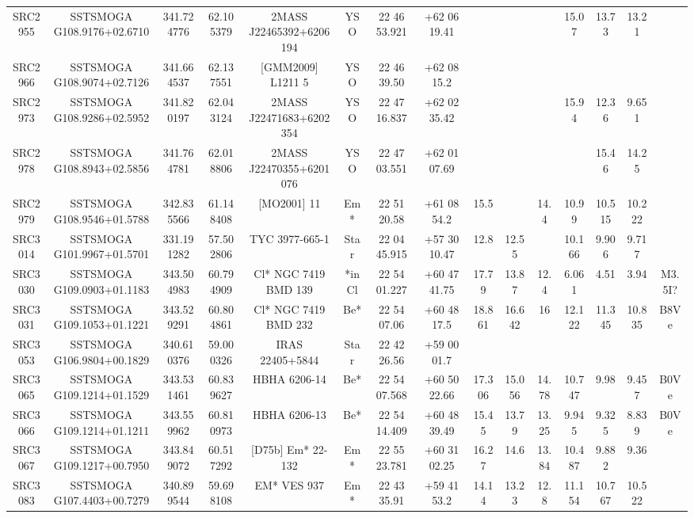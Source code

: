 \begin{table}
\begin{tabular}{ccccccccccccccc}
SRC2955 & SSTSMOGA G108.9176+02.6710 & 341.724776 & 62.105379 & 2MASS J22465392+6206194 & YSO & 22 46 53.921 & +62 06 19.41 &  &  &  & 15.07 & 13.73 & 13.21 &  \\
SRC2966 & SSTSMOGA G108.9074+02.7126 & 341.664537 & 62.137551 & [GMM2009] L1211  5 & YSO & 22 46 39.50 & +62 08 15.2 &  &  &  &  &  &  &  \\
SRC2973 & SSTSMOGA G108.9286+02.5952 & 341.820197 & 62.043124 & 2MASS J22471683+6202354 & YSO & 22 47 16.837 & +62 02 35.42 &  &  &  & 15.94 & 12.36 & 9.651 &  \\
SRC2978 & SSTSMOGA G108.8943+02.5856 & 341.764781 & 62.018806 & 2MASS J22470355+6201076 & YSO & 22 47 03.551 & +62 01 07.69 &  &  &  &  & 15.46 & 14.25 &  \\
SRC2979 & SSTSMOGA G108.9546+01.5788 & 342.835566 & 61.148408 & [MO2001]  11 & Em* & 22 51 20.58 & +61 08 54.2 & 15.5 &  & 14.4 & 10.99 & 10.515 & 10.222 &  \\
SRC3014 & SSTSMOGA G101.9967+01.5701 & 331.191282 & 57.502806 & TYC 3977-665-1 & Star & 22 04 45.915 & +57 30 10.47 & 12.8 & 12.55 &  & 10.166 & 9.906 & 9.717 &  \\
SRC3030 & SSTSMOGA G109.0903+01.1183 & 343.504983 & 60.794909 & Cl* NGC 7419    BMD     139 & *inCl & 22 54 01.227 & +60 47 41.75 & 17.79 & 13.87 & 12.4 & 6.061 & 4.51 & 3.94 & M3.5I? \\
SRC3031 & SSTSMOGA G109.1053+01.1221 & 343.529291 & 60.804861 & Cl* NGC 7419    BMD     232 & Be* & 22 54 07.06 & +60 48 17.5 & 18.861 & 16.642 & 16 & 12.122 & 11.345 & 10.835 & B8Ve \\
SRC3053 & SSTSMOGA G106.9804+00.1829 & 340.610376 & 59.000326 & IRAS 22405+5844 & Star & 22 42 26.56 & +59 00 01.7 &  &  &  &  &  &  &  \\
SRC3065 & SSTSMOGA G109.1214+01.1529 & 343.531461 & 60.839627 & HBHA 6206-14 & Be* & 22 54 07.568 & +60 50 22.66 & 17.306 & 15.056 & 14.78 & 10.747 & 9.98 & 9.457 & B0Ve \\
SRC3066 & SSTSMOGA G109.1214+01.1211 & 343.559962 & 60.810973 & HBHA 6206-13 & Be* & 22 54 14.409 & +60 48 39.49 & 15.45 & 13.79 & 13.25 & 9.945 & 9.325 & 8.839 & B0Ve \\
SRC3067 & SSTSMOGA G109.1217+00.7950 & 343.849072 & 60.517292 & [D75b] Em* 22-132 & Em* & 22 55 23.781 & +60 31 02.25 & 16.27 & 14.6 & 13.84 & 10.487 & 9.882 & 9.36 &  \\
SRC3083 & SSTSMOGA G107.4403+00.7279 & 340.899544 & 59.698108 & EM* VES  937 & Em* & 22 43 35.91 & +59 41 53.2 & 14.14 & 13.23 & 12.8 & 11.154 & 10.767 & 10.522 &  \\

\end{tabular}
\end{table}
